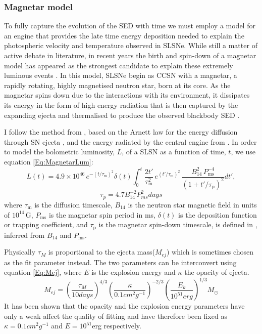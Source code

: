 \subsubsection{Magnetar model}
\label{sec:Magnetar}
To fully capture the evolution of the SED with time we must employ a model for an engine that provides the late time energy deposition needed to explain the photospheric velocity and temperature observed in SLSNe. While still a matter of active debate in literature, in recent years the birth and spin-down of a magnetar model has appeared as the strongest candidate to explain these extremely luminous events \citep{2013ApJ...770..128I,2013Natur.502..346N}. In this model, SLSNe begin as CCSN with a magnetar, a rapidly rotating, highly magnetised neutron star, born at its core. As the magnetar spins down due to the interactions with its environment, it dissipates its energy in the form of high energy radiation that is then captured by the expanding ejecta and thermalised to produce the observed blackbody SED \citep{2010ApJ...717..245K,2010ApJ...719L.204W,2012MNRAS.426L..76D}.

I follow the method from \citet{2013ApJ...770..128I}, based on the Arnett law for the energy diffusion through SN ejecta \citep{Arnett1982}, and the energy radiated by the central engine from \citet{Bildsten2013,Wosley2012}. In order to model the bolometric luminosity, $L$, of a SLSN as a function of time, $t$, we use equation \ref{Eq:MagnetarLum}:
\begin{equation}
L(t) = 4.9\times 10^{46}\,e^{ -(t / \tau_\mathrm{m})^2 }\delta(t) \int_{0}^{t} \frac{2t'}{\tau_\mathrm{m}^2}\,e^{(t'/\tau_\mathrm{m})^2}\,\frac{B_{14}^{2}\,P_{\mathrm{ms}}^{-4}}{\left(1+t'/\tau_\mathrm{p}\right)^2} dt',
\label{Eq:MagnetarLum}
\end{equation}
\begin{equation}
\label{Eq:SDPeriod}
\tau_{p} = 4.7B_{14}^{-2}P_{ms}^{2}days
\end{equation}
\noindent where $\tau_\mathrm{m}$ is the diffusion timescale, $B_{14}$ is the neutron star magnetic field in units of $10^{14}$\,G, $P_{\mathrm{ms}}$ is the magnetar spin period in ms, $\delta(t)$ is the deposition function or trapping coefficient, and $\tau_\mathrm{p}$ is the magnetar spin-down timescale, is defined in , inferred from $B_{14}$ and $P_{\mathrm{ms}}$.

Physically $\tau_M$ is proportional to the ejecta mass($M_{ej}$) which is sometimes chosen as the fit parameter instead. The two parameters can be interconvert using equation \ref{Eq:Mej}, where $E$ is the explosion energy and $\kappa$ the opacity of ejecta.
\begin{equation}
\label{Eq:Mej}
M_{ej} = (\frac{\tau_{M}}{10days})^{4/3}(\frac{\kappa}{0.1cm^2g^{-1}})^{-2/3}(\frac{E_k}{10^{51}erg})^{1/3}M_{\odot}
\end{equation}
\noindent It has been shown \citep{2013ApJ...770..128I,2014ApJ...796...87I,2015MNRAS.452.3869N,2015MNRAS.449.1215P} that the opacity and the explosion energy parameters have only a weak affect the quality of fitting and have therefore been fixed as $\kappa = 0.1cm^2g^{-1}$ and $E = 10^{51}$erg respectively.

